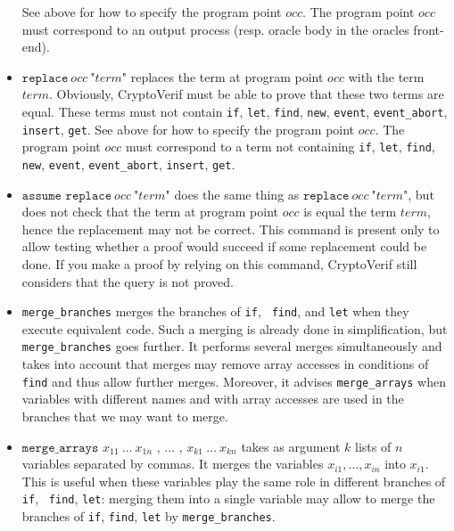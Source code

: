 \documentclass{article}
\begin{document}
\begin{itemize}
See above for how to specify the program point $occ$. 
The program point $occ$ must
correspond to an output process (resp. oracle body in the oracles
front-end).

\item $\texttt{replace}\ occ\ \texttt{"}term\texttt{"}$ replaces the term at program point
  $occ$ with the term $term$. Obviously, CryptoVerif must be able to
  prove that these two terms are equal.
  These terms must not contain \texttt{if}, \texttt{let},
  \texttt{find}, \texttt{new}, \texttt{event}, \texttt{event\_abort}, \texttt{insert}, \texttt{get}.
See above for how to specify the program point $occ$. 
The program point $occ$ must correspond to a term not containing \texttt{if}, \texttt{let},
  \texttt{find}, \texttt{new}, \texttt{event}, \texttt{event\_abort}, \texttt{insert}, \texttt{get}.

\item $\texttt{assume replace}\ occ\ \texttt{"}term\texttt{"}$ does the same thing as $\texttt{replace}\ occ\ \texttt{"}term\texttt{"}$, but does not check that the term at program point $occ$ is equal the term $term$, hence the replacement may not be correct. This command is present only to allow testing whether a proof would succeed if some replacement could be done. If you make a proof by relying on this command, CryptoVerif still considers that the query is not proved.

\item \texttt{merge\_branches} merges the branches of {\tt if}, {\tt
    find}, and {\tt let} when they execute equivalent code. Such a
  merging is already done in simplification, but
  \texttt{merge\_branches} goes further. It performs several merges
  simultaneously and takes into account that merges may remove array
  accesses in conditions of {\tt find} and thus allow further
  merges. Moreover, it advises {\tt merge\_arrays} when variables with
  different names and with array accesses are used in the branches
  that we may want to merge.

\item $\texttt{merge\_arrays } x_{11}\ \ldots\ x_{1n} \texttt{ , }
  \ldots \texttt{ , } x_{k1}\ \ldots\ x_{kn}$ takes as argument $k$
  lists of $n$ variables separated by commas. It merges the variables
  $x_{i1}, \ldots, x_{in}$ into $x_{i1}$. This is useful when these
  variables play the same role in different branches of {\tt if}, {\tt
    find}, {\tt let}: merging them into a single variable may allow to
  merge the branches of {\tt if}, {\tt find}, {\tt let} by
  \texttt{merge\_branches}. 


\end{itemize}
\end{document}
